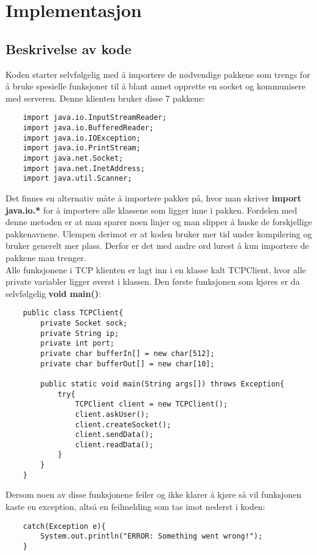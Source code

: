 \section{Implementasjon}
\subsection{Beskrivelse av kode}
Koden starter selvfølgelig med å importere de nødvendige pakkene som trengs for å bruke spesielle funksjoner til å blant annet opprette en socket og kommunisere med serveren. Denne klienten bruker disse 7 pakkene:
\begin{lstlisting}
	import java.io.InputStreamReader;
	import java.io.BufferedReader;
	import java.io.IOException;
	import java.io.PrintStream;
	import java.net.Socket;
	import java.net.InetAddress;
	import java.util.Scanner;
\end{lstlisting}

Det finnes en alternativ måte å importere pakker på, hvor man skriver \textbf{import java.io.*} for å importere alle klassene som ligger inne i pakken. Fordelen med denne metoden er at man sparer noen linjer og man slipper å huske de forskjellige pakkenavnene. Ulempen derimot er at koden bruker mer tid under kompilering og bruker generelt mer plass. Derfor er det med andre ord lurest å kun importere de pakkene man trenger.\\

Alle funksjonene i TCP klienten er lagt inn i en klasse kalt TCPClient, hvor alle private variabler ligger øverst i klassen. Den første funksjonen som kjøres er da selvfølgelig \textbf{void main()}:
\begin{lstlisting}
	public class TCPClient{
		private Socket sock;
		private String ip;
		private int port;
		private char bufferIn[] = new char[512];
		private char bufferOut[] = new char[10];
		
		public static void main(String args[]) throws Exception{
			try{
				TCPClient client = new TCPClient();
				client.askUser();
				client.createSocket();
				client.sendData();
				client.readData();
			}
		}
	}
\end{lstlisting}

Dersom noen av disse funksjonene feiler og ikke klarer å kjøre så vil funksjonen kaste en exception, altså en feilmelding som tas imot nederst i koden:
\begin{lstlisting}
	catch(Exception e){
		System.out.println("ERROR: Something went wrong!");
	}
\end{lstlisting}

